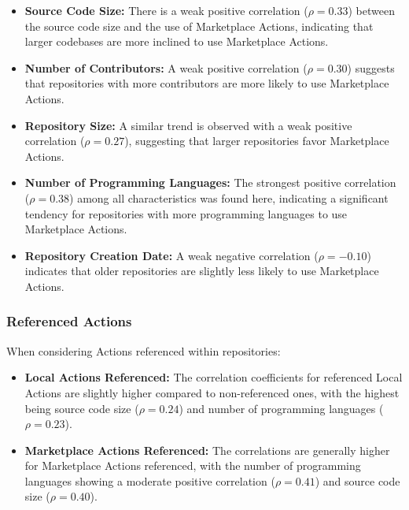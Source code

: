 \documentclass[conference]{IEEEtran}
\begin{document}
      \begin{itemize}
          \item \textbf{Source Code Size:} There is a weak positive correlation (\(\rho = 0.33\)) between the source code size and the use of Marketplace Actions, indicating that larger codebases are more inclined to use Marketplace Actions.
          \item \textbf{Number of Contributors:} A weak positive correlation (\(\rho = 0.30\)) suggests that repositories with more contributors are more likely to use Marketplace Actions.
          \item \textbf{Repository Size:} A similar trend is observed with a weak positive correlation (\(\rho = 0.27\)), suggesting that larger repositories favor Marketplace Actions.
          \item \textbf{Number of Programming Languages:} The strongest positive correlation (\(\rho = 0.38\)) among all characteristics was found here, indicating a significant tendency for repositories with more programming languages to use Marketplace Actions.
          \item \textbf{Repository Creation Date:} A weak negative correlation (\(\rho = -0.10\)) indicates that older repositories are slightly less likely to use Marketplace Actions.\\
      \end{itemize}
      
      \subsubsection{Referenced Actions}
      When considering Actions referenced within repositories:
      
      \begin{itemize}
          \item \textbf{Local Actions Referenced:} The correlation coefficients for referenced Local Actions are slightly higher compared to non-referenced ones, with the highest being source code size (\(\rho = 0.24\)) and number of programming languages (\(\rho = 0.23\)).
          \item \textbf{Marketplace Actions Referenced:} The correlations are generally higher for Marketplace Actions referenced, with the number of programming languages showing a moderate positive correlation (\(\rho = 0.41\)) and source code size (\(\rho = 0.40\)).\\
      \end{itemize}
\end{document}
